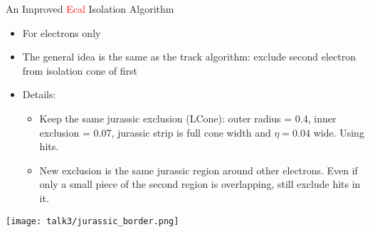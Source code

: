\documentclass{beamer}
\begin{document}
\begin{frame}{An Improved \textcolor{red}{Ecal} Isolation Algorithm}
  \begin{itemize}
    \item For electrons only
    \item The general idea is the same as the track algorithm: exclude second electron from isolation cone of first
    \item Details: %
      \begin{itemize}
      \item Keep the same jurassic exclusion (LCone): outer radius = 0.4, inner exclusion = 0.07, jurassic strip is full cone width and $\eta = 0.04$ wide. Using hits.
      \item New exclusion is the same jurassic region around other electrons. Even if only a small piece of the second region is overlapping, still exclude hits in it.
      \end{itemize}
  \end{itemize}
  \begin{center}  
    \texttt{[image: talk3/jurassic\_border.png]}
  \end{center}
\end{frame}
\end{document}
